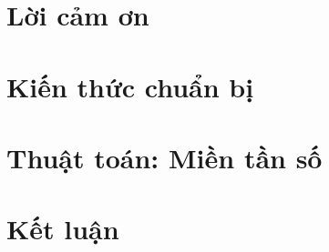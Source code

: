 \documentclass[12pt,a4paper]{report}
\theoremstyle{plain}
\theoremstyle{definition}
\begin{document}

\chapter*{Lời cảm ơn}

\newpage
\tableofcontents
\newpage
\listoffigures
\chapter*{}


\chapter{Kiến thức chuẩn bị}


\chapter{Thuật toán: Miền tần số}


\chapter{Kết luận}


\printbibliography
\end{document}
